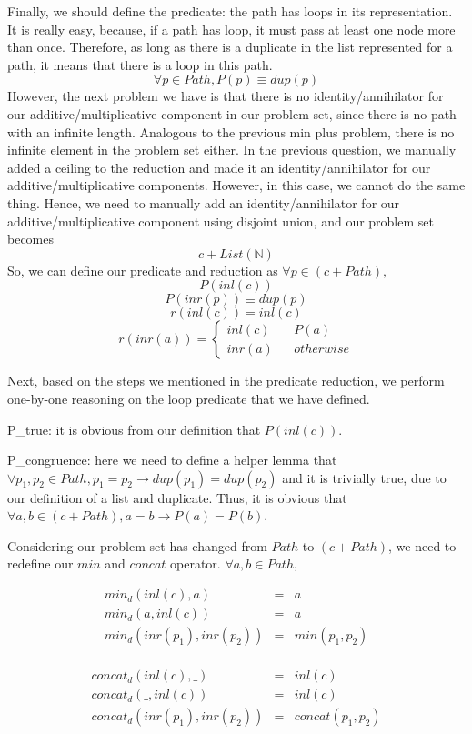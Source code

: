 \documentclass[a4paper,12pt,twoside,openright]{report}
\newcommand{\e}[2]{
\begin{equation}
  \label{#1} 
  #2
\end{equation}
}
\begin{document}
Finally, we should define the predicate: the path has loops in its representation. It is really easy, because, if a path has loop, it must pass at least one node more than once. 
Therefore, as long as there is a duplicate in the list represented for a path, it means that there is a loop in this path.
\[\forall p \in Path, P(p) \equiv dup(p)\]
However, the next problem we have is that there is no identity/annihilator for our additive/multiplicative component in our problem set, since there is no path with an infinite length.
Analogous to the previous min plus problem, there is no infinite element in the problem set either. In the previous question, we manually added a ceiling to the reduction and made it an identity/annihilator for our additive/multiplicative components. However, in this case, we cannot do the same thing. 
Hence, we need to manually add an identity/annihilator for our additive/multiplicative component using disjoint union, and our problem set becomes \[c + List(\mathbb{N})\]
So, we can define our predicate and reduction as $\forall p \in (c + Path),$
\[ P(inl(c))\]
\[ P(inr(p)) \equiv dup(p)\]
\[ r(inl(c)) = inl(c)\]
\[
r(inr (a)) =
\left\{
\begin{aligned}
inl(c) &  & P(a) \\
inr(a) &  & otherwise 
\end{aligned}
\right.\]

Next, based on the steps we mentioned in the predicate reduction, we perform one-by-one reasoning on the loop predicate that we have defined.

P\_true: it is obvious from our definition that $P(inl(c))$.

P\_congruence: here we need to define a helper lemma that $\forall p_1,p_2 \in Path, p_1 = p_2 \rightarrow dup(p_1) = dup(p_2)$ and it is trivially true, due to our definition of a list and duplicate. 
Thus, it is obvious that $\forall a,b \in (c + Path), a = b \rightarrow P(a) = P(b)$.

Considering our problem set has changed from $Path$ to $(c + Path)$, we need to redefine our $min$ and $concat$ operator. $\forall a,b \in Path,$
\e{pf:def:elementary_path_min_d}{
\begin{array}{rcl}
min_d(inl(c),a)	 & = & a \\
min_d(a,inl(c))	 & = & a \\
min_d(inr(p_1),inr(p_2))	 & = & min(p_1,p_2)\\
\end{array}
}

\e{pf:def:elementary_path_concat_d}{
\begin{array}{rcl}
concat_d(inl(c),\_)	 & = & inl(c) \\
concat_d(\_,inl(c))	 & = & inl(c) \\
concat_d(inr(p_1),inr(p_2))	 & = & concat(p_1,p_2)\\
\end{array}
}
\end{document}
